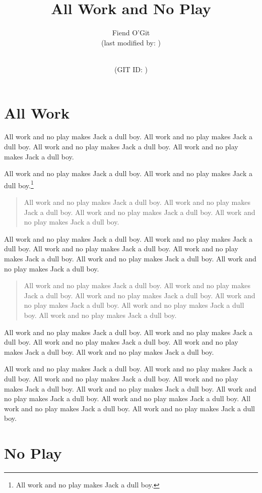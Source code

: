 \documentclass[12pt]{article}
\author{Fiend O'Git\\
  {\footnotesize (last modified by: \gitinfo{@head}{author})}}
\title{All Work and No Play}
\date{\gitinfo{@head}{dt@today}\\
  {\footnotesize (GIT ID: \texttt{\gitinfo{@head}{commit}})}}
\begin{document}
\maketitle
\thispagestyle{empty}

\section{All Work}

All work and no play makes Jack a dull boy.
All work and no play makes Jack a dull boy.
All work and no play makes Jack a dull boy.
All work and no play makes Jack a dull boy.

All work and no play makes Jack a dull boy.
All work and no play makes Jack a dull boy.\footnote{
All work and no play makes Jack a dull boy.}
\begin{quote}
All work and no play makes Jack a dull boy.
All work and no play makes Jack a dull boy.
All work and no play makes Jack a dull boy.
All work and no play makes Jack a dull boy.
\end{quote}
All work and no play makes Jack a dull boy.
All work and no play makes Jack a dull boy.
All work and no play makes Jack a dull boy.
All work and no play makes Jack a dull boy.
All work and no play makes Jack a dull boy.
All work and no play makes Jack a dull boy.

\begin{quote}
All work and no play makes Jack a dull boy.
All work and no play makes Jack a dull boy.
All work and no play makes Jack a dull boy.
All work and no play makes Jack a dull boy.
All work and no play makes Jack a dull boy.
All work and no play makes Jack a dull boy.
\end{quote}

All work and no play makes Jack a dull boy.
All work and no play makes Jack a dull boy.
All work and no play makes Jack a dull boy.
All work and no play makes Jack a dull boy.
All work and no play makes Jack a dull boy.

All work and no play makes Jack a dull boy.
All work and no play makes Jack a dull boy.
All work and no play makes Jack a dull boy.
All work and no play makes Jack a dull boy.
All work and no play makes Jack a dull boy.
All work and no play makes Jack a dull boy.
All work and no play makes Jack a dull boy.
All work and no play makes Jack a dull boy.
All work and no play makes Jack a dull boy.

\section{No Play}
\end{document}
